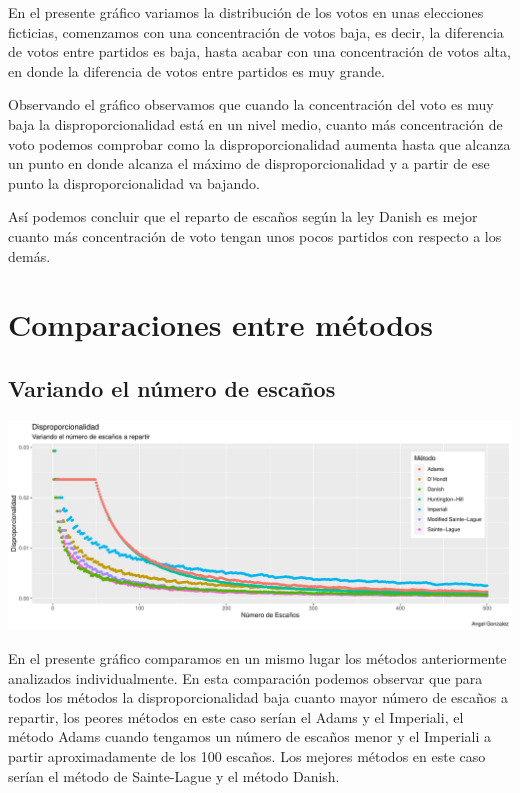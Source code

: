 \documentclass[12pt,a4paper,]{book}
\numberwithin{dummy}{section}
\theoremstyle{ocrenumbox}
\theoremstyle{blacknumex}
\theoremstyle{blacknumbox}
\theoremstyle{ocrenum}
\theoremstyle{ocrenum}
\begin{document}
En el presente gráfico variamos la distribución de los votos en unas
elecciones ficticias, comenzamos con una concentración de votos baja, es
decir, la diferencia de votos entre partidos es baja, hasta acabar con
una concentración de votos alta, en donde la diferencia de votos entre
partidos es muy grande.

Observando el gráfico observamos que cuando la concentración del voto es
muy baja la disproporcionalidad está en un nivel medio, cuanto más
concentración de voto podemos comprobar como la disproporcionalidad
aumenta hasta que alcanza un punto en donde alcanza el máximo de
disproporcionalidad y a partir de ese punto la disproporcionalidad va
bajando.

Así podemos concluir que el reparto de escaños según la ley Danish es
mejor cuanto más concentración de voto tengan unos pocos partidos con
respecto a los demás.

\hypertarget{comparaciones-entre-muxe9todos}{%
\section{Comparaciones entre
métodos}\label{comparaciones-entre-muxe9todos}}

\hypertarget{variando-el-nuxfamero-de-escauxf1os}{%
\subsection{Variando el número de
escaños}\label{variando-el-nuxfamero-de-escauxf1os}}

\begin{center}\includegraphics[width=0.95\linewidth]{figurasR/unnamed-chunk-42-1} \end{center}

En el presente gráfico comparamos en un mismo lugar los métodos
anteriormente analizados individualmente. En esta comparación podemos
observar que para todos los métodos la disproporcionalidad baja cuanto
mayor número de escaños a repartir, los peores métodos en este caso
serían el Adams y el Imperiali, el método Adams cuando tengamos un
número de escaños menor y el Imperiali a partir aproximadamente de los
100 escaños. Los mejores métodos en este caso serían el método de
Sainte-Lague y el método Danish.
\end{document}
